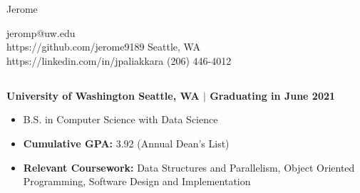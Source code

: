 \documentclass[12pt]{article}
\begin{document}
\begin{center}
    \Huge{Jerome\textbf{ \color{crimson}{Paliakkara}}}
\end{center}
jeromp@uw.edu \hfill \\
https://github.com/jerome9189 \hfill Seattle, WA\\
https://linkedin.com/in/jpaliakkara \hfill (206) 446-4012
\begin{spacing}{0.25}
\section*{\color{crimson}{Education}}
\textbf{University of Washington \hfill Seattle, WA $|$ Graduating in June 2021}
\begin{itemize}
\setlength\itemsep{0.1em}
    \item B.S. in Computer Science with Data Science
    \item \textbf{Cumulative GPA:} 3.92 (Annual Dean's List)
    \item \textbf{Relevant Coursework:} Data Structures and Parallelism, Object Oriented Programming, Software Design and Implementation
\end{itemize}

\end{spacing}
\end{document}
